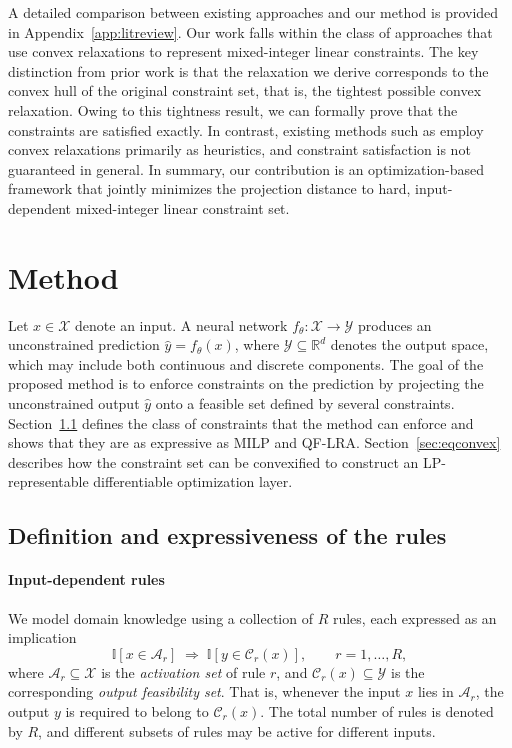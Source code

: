 \documentclass{article}
\theoremstyle{plain}
\theoremstyle{definition}
\theoremstyle{remark}
\begin{document}
A detailed comparison between existing approaches and our method is provided in Appendix~\ref{app:litreview}. Our work falls within the class of approaches that use convex relaxations to represent mixed-integer linear constraints. The key distinction from prior work is that the relaxation we derive corresponds to the convex hull of the original constraint set, that is, the tightest possible convex relaxation. Owing to this tightness result, we can formally prove that the constraints are satisfied exactly. In contrast, existing methods such as \cite{wilder2019melding, Ferber_Wilder_Dilkina_Tambe_2020, mckenzie2024differentiating} employ convex relaxations primarily as heuristics, and constraint satisfaction is not guaranteed in general.  In summary, our contribution is an optimization-based framework that jointly minimizes the projection distance to hard, input-dependent mixed-integer linear constraint set.


\section{Method}
Let $x \in \mathcal{X}$ denote an input. A neural network $f_\theta : \mathcal{X} \to \mathcal{Y}$ produces an unconstrained prediction $\hat{y} = f_\theta(x)$, where $\mathcal{Y} \subseteq \mathbb{R}^d$ denotes the output space, which may include both continuous and discrete components. The goal of the proposed method is to enforce constraints on the prediction by projecting the unconstrained output $\hat{y}$ onto a feasible set defined by several constraints. Section~\ref{sec:defandexpre} defines the class of constraints that the method can enforce and shows that they are as expressive as MILP and QF-LRA. Section~\ref{sec:eqconvex} describes how the constraint set can be convexified to construct an LP-representable differentiable optimization layer.

\subsection{Definition and expressiveness of the rules}
\label{sec:defandexpre}
\paragraph{Input-dependent rules}
We model domain knowledge using a collection of $R$ rules, each expressed as an implication
\begin{equation}
\mathbb{I}[x \in \mathcal{A}_r]
\;\Rightarrow\;
\mathbb{I}[y \in \mathcal{C}_r(x)],
\qquad r = 1,\dots,R,
\end{equation}
where $\mathcal{A}_r \subseteq \mathcal{X}$ is the \emph{activation set} of rule $r$, and $\mathcal{C}_r(x) \subseteq \mathcal{Y}$ is the corresponding \emph{output feasibility set}. That is, whenever the input $x$ lies in $\mathcal{A}_r$, the output $y$ is required to belong to $\mathcal{C}_r(x)$. The total number of rules is denoted by $R$, and different subsets of rules may be active for different inputs.
\end{document}
